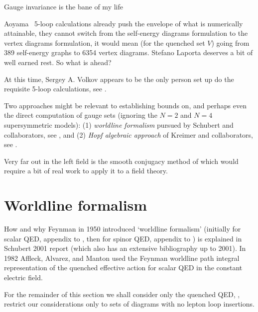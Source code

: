 \begin{bartlett}{
{Gauge invariance is the bane of my life}
        }
\end{bartlett}
\bigskip

\noindent
Aoyama \etal\ 5-loop calculations already push the envelope of what is
numerically attainable, they cannot switch from the self-energy
diagrams formulation to the vertex diagrams formulation, it would mean
(for the quenched set $V$) going from 389 self-energy graphs to 6354
vertex diagrams. Stefano Laporta deserves a bit of well earned rest. So
what is ahead?

At this time, Sergey  A. Volkov appears to be the
only person set up do the requisite 5-loop calculations,
see .

Two approaches might be relevant to
establishing bounds on, and perhaps even the direct computation
of gauge sets (ignoring the $N\!=\!2$ and $N\!=\!4$
supersymmetric models):
(1)
\emph{worldline formalism} pursued by
{Schubert} and collaborators,
see ,
and
(2)
\emph{Hopf algebraic approach} of Kreimer and collaborators,
see .

Very far out in the left field is the smooth conjugacy method of
 which would require a bit of real work to apply it
to a field theory.



\section{Worldline formalism}
\label{sect:worldline}

How and why Feynman in 1950 introduced `worldline formalism' (initially
for scalar QED, appendix to , then for spinor QED,
appendix to ) is explained in Schubert 2001
report (which also has an extensive bibliography up to
2001).
In 1982 Affleck, Alvarez, and Manton used the Feynman
worldline path integral representation of the quenched effective action
for scalar QED in the constant electric field.

For the remainder of this section we shall consider only the quenched
QED, \ie, restrict our considerations only to sets of diagrams with no
lepton loop insertions.

